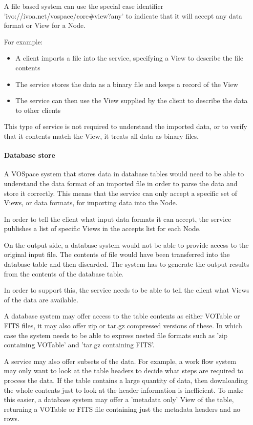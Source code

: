 \documentclass[11pt,a4paper]{ivoa}
\begin{document}
A file based system can use the special case identifier 'ivo://ivoa.net/vospace/core\#view?any' to indicate that it will accept any data format or View for a Node.

For example:

\begin{itemize}
    \item A client imports a file into the service, specifying a View to describe the file contents
    \item The service stores the data as a binary file and keeps a record of the View
    \item The service can then use the View supplied by the client to describe the data to other clients
\end{itemize}

This type of service is not required to understand the imported data, or to verify that it contents match the View, it treats all data as binary files.

\paragraph{Database store}
A VOSpace system that stores data in database tables would need to be able to understand the data format of an imported file in order to parse the data and store it correctly. This means that the service can only accept a specific set of Views, or data formats, for importing data into the Node.

In order to tell the client what input data formats it can accept, the service publishes a list of specific Views in the accepts list for each Node.

On the output side, a database system would not be able to provide access to the original input file. The contents of file would have been transferred into the database table and then discarded. The system has to generate the output results from the contents of the database table.

In order to support this, the service needs to be able to tell the client what Views of the data are available.

A database system may offer access to the table contents as either VOTable or FITS files, it may also offer zip or tar.gz compressed versions of these. In which case the system needs to be able to express nested file formats such as 'zip containing VOTable' and 'tar.gz containing FITS'.

A service may also offer subsets of the data. For example, a work flow system may only want to look at the table headers to decide what steps are required to process the data. If the table contains a large quantity of data, then downloading the whole contents just to look at the header information is inefficient. To make this easier, a database system may offer a 'metadata only' View of the table, returning a VOTable or FITS file containing just the metadata headers and no rows.
\end{document}
